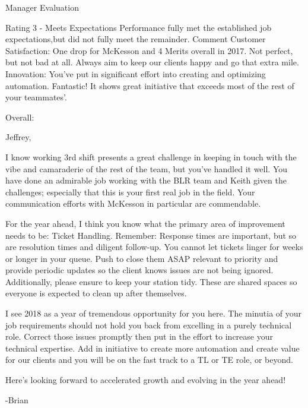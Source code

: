 


\begin{cvparagraph}
Manager Evaluation

    Rating
        3 - Meets Expectations
    Performance fully met the established job expectations,but did not fully meet the remainder.
    Comment
        Customer Satisfaction: One drop for McKesson and 4 Merits overall in 2017. 
        Not perfect, but not bad at all. 
        Always aim to keep our clients happy and go that extra mile.
        Innovation: You've put in significant effort into creating and optimizing automation. 
        Fantastic! It shows great initiative that exceeds most of the rest of your teammates'.

    Overall:

    Jeffrey,

    I know working 3rd shift presents a great challenge in keeping in touch with the vibe and camaraderie of the rest of the team, but you've handled it well.
    You have done an admirable job working with the BLR team and Keith given the challenges; especially that this is your first real job in the field. 
    Your communication efforts with McKesson in particular are commendable.

    For the year ahead, I think you know what the primary area of improvement needs to be: Ticket Handling. 
    Remember: Response times are important, but so are resolution times and diligent follow-up. 
    You cannot let tickets linger for weeks or longer in your queue. 
    Push to close them ASAP relevant to priority and provide periodic updates so the client knows issues are not being ignored.
    Additionally, please ensure to keep your station tidy. 
    These are shared spaces so everyone is expected to clean up after themselves.

    I see 2018 as a year of tremendous opportunity for you here. 
    The minutia of your job requirements should not hold you back from excelling in a purely technical role. 
    Correct those issues promptly then put in the effort to increase your technical expertise. 
    Add in initiative to create more automation and create value for our clients and you will be on the fast track to a TL or TE role, or beyond.

    Here's looking forward to accelerated growth and evolving in the year ahead!

    -Brian
\end{cvparagraph}

